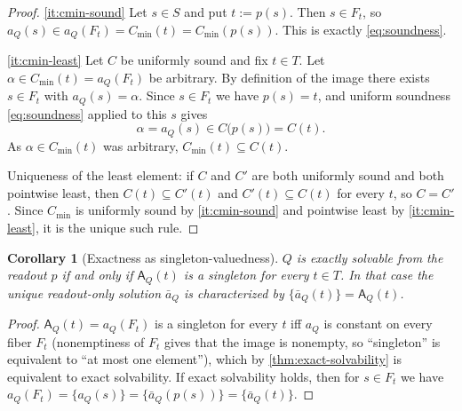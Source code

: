 \documentclass[11pt,reqno]{amsart}
\theoremstyle{plain}
\newtheorem{corollary}[theorem]{Corollary}
\theoremstyle{definition}
\newcommand{\Src}{S}
\newcommand{\Rdt}{T}
\newcommand{\CompatSet}{\mathsf{A}}      %
\begin{document}
\begin{proof}
\eqref{it:cmin-sound} Let $s\in\Src$ and put $t:=p(s)$. Then $s\in F_t$, so
$a_Q(s)\in a_Q(F_t)=C_{\min}(t)=C_{\min}(p(s))$. This is exactly \eqref{eq:soundness}.

\eqref{it:cmin-least} Let $C$ be uniformly sound and fix $t\in\Rdt$. Let
$\alpha\in C_{\min}(t)=a_Q(F_t)$ be arbitrary. By definition of the image there exists $s\in F_t$
with $a_Q(s)=\alpha$. Since $s\in F_t$ we have $p(s)=t$, and uniform soundness \eqref{eq:soundness}
applied to this $s$ gives
\begin{equation*}
\alpha=a_Q(s)\in C\bigl(p(s)\bigr)=C(t).
\end{equation*}
As $\alpha\in C_{\min}(t)$ was arbitrary, $C_{\min}(t)\subseteq C(t)$.

Uniqueness of the least element: if $C$ and $C'$ are both uniformly sound and both pointwise
least, then $C(t)\subseteq C'(t)$ and $C'(t)\subseteq C(t)$ for every $t$, so $C=C'$. Since
$C_{\min}$ is uniformly sound by \eqref{it:cmin-sound} and pointwise least by
\eqref{it:cmin-least}, it is the unique such rule.
\end{proof}

\begin{corollary}[Exactness as singleton-valuedness]\label{cor:singleton}
$Q$ is exactly solvable from the readout $p$ if and only if $\CompatSet_Q(t)$ is a singleton for
every $t\in\Rdt$. In that case the unique readout-only solution $\bar a_Q$ is characterized by
$\{\bar a_Q(t)\}=\CompatSet_Q(t)$.
\end{corollary}

\begin{proof}
$\CompatSet_Q(t)=a_Q(F_t)$ is a singleton for every $t$ iff $a_Q$ is constant on every fiber
$F_t$ (nonemptiness of $F_t$ gives that the image is nonempty, so ``singleton'' is equivalent to
``at most one element''), which by \cref{thm:exact-solvability} is equivalent to exact
solvability. If exact solvability holds, then for $s\in F_t$ we have
$a_Q(F_t)=\{a_Q(s)\}=\{\bar a_Q(p(s))\}=\{\bar a_Q(t)\}$.
\end{proof}
\end{document}
